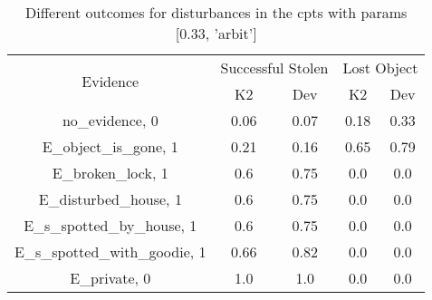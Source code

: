 \begin{table}\begin{tabular}{c|cc|cc}\toprule\multirow{2}{*}{Evidence} & \multicolumn{2}{c}{Successful Stolen} & \multicolumn{2}{c}{Lost Object} \\& {K2} & {Dev} & {K2} & {Dev} \\\midrule
no\_evidence, 0 & \cellcolor{Bittersweet}0.06&\cellcolor{Bittersweet}0.07&\cellcolor{Bittersweet}0.18&\cellcolor{Bittersweet}0.33\\E\_object\_is\_gone, 1 & \cellcolor{Bittersweet}0.21&\cellcolor{Bittersweet}0.16&\cellcolor{Bittersweet}0.65&\cellcolor{Bittersweet}0.79\\E\_broken\_lock, 1 & \cellcolor{Bittersweet}0.6&\cellcolor{Bittersweet}0.75&0.0&0.0\\E\_disturbed\_house, 1 & \cellcolor{Bittersweet}0.6&\cellcolor{Bittersweet}0.75&0.0&0.0\\E\_s\_spotted\_by\_house, 1 & \cellcolor{Bittersweet}0.6&\cellcolor{Bittersweet}0.75&0.0&0.0\\E\_s\_spotted\_with\_goodie, 1 & \cellcolor{Bittersweet}0.66&\cellcolor{Bittersweet}0.82&0.0&0.0\\E\_private, 0 & 1.0&1.0&0.0&0.0\\\bottomrule\end{tabular}\caption{Different outcomes for disturbances in the cpts with params [0.33, 'arbit']}\end{table}